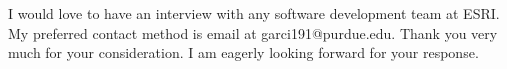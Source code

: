 \documentclass[10pt,stdletter,dateno,sigleft,letterpaper]{newlfm} %
\begin{document}
\begin{newlfm}
I would love to have an interview with any software development team at ESRI. My preferred contact method is email at garci191@purdue.edu. Thank you very much for your consideration. I am eagerly looking forward for your response.



\end{newlfm}
\end{document}
